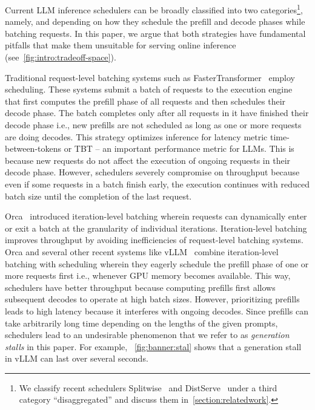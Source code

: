 Current LLM inference schedulers can be broadly classified into two categories\footnote{We classify recent schedulers Splitwise~\cite{patel2023splitwise} and DistServe~\cite{distserve2024} under a third category ``disaggregated'' and discuss them in~\autoref{section:relatedwork}.}, namely, 
\prefillprio and \decodeprio depending on how they schedule the prefill and decode phases while batching requests. In this paper, we argue that  both strategies have fundamental pitfalls that make them unsuitable for serving online inference (see~\autoref{fig:intro:tradeoff-space}).



Traditional request-level batching systems such as FasterTransformer~\cite{fastertransformer} employ \decodeprio scheduling. These systems submit a batch of requests to the execution engine that first computes the prefill phase of all requests and then schedules their decode phase. The batch completes only after all requests in it have finished their decode phase i.e., new prefills are not scheduled as long as one or more requests are doing decodes. This strategy optimizes inference for latency metric time-between-tokens or TBT -- an important performance metric for LLMs. This is because new requests do not affect the execution of ongoing requests in their  decode phase. However, \decodeprio schedulers severely compromise on throughput because even if some requests in a batch finish early, the execution continues with reduced batch size until the completion of the last request. 






Orca~\cite{orca} introduced iteration-level batching wherein requests can dynamically enter or exit a batch at the granularity of individual iterations. Iteration-level batching improves throughput by avoiding inefficiencies of request-level batching systems. Orca and several other recent systems like vLLM~\cite{vLLM:github} combine iteration-level batching with \prefillprio scheduling wherein they eagerly schedule the prefill phase of one or more requests first i.e., whenever GPU memory becomes available. This way, \prefillprio schedulers have better throughput because computing prefills first allows subsequent decodes to operate at high batch sizes. However, prioritizing prefills leads to high latency because it interferes with ongoing decodes. Since prefills can take arbitrarily long time depending on the lengths of the given prompts, \prefillprio schedulers lead to an undesirable phenomenon that we refer to as \textit{generation stalls} in this paper. For example, ~\autoref{fig:banner:stal} shows that a generation stall in vLLM can last over several seconds.

